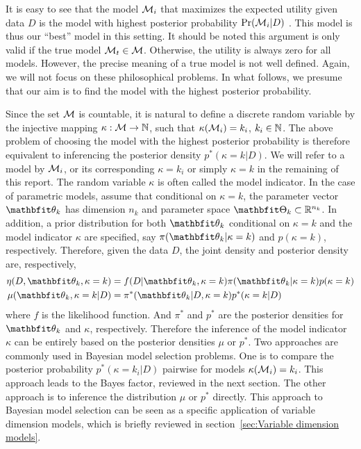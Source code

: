 It is easy to see that the model $\mathcal{M}_i$ that maximizes the expected utility
given data $D$ is the model with highest posterior probability
$\Pr(\mathcal{M}_i|D)$ \parencite[see][chap.~6]{Bernardo2000}. This model is thus
our ``best'' model in this setting. It should be noted this argument is only
valid if the true model $\mathcal{M}_t \in \mathcal{M}$. Otherwise, the utility is always
zero for all models. However, the precise meaning of a true model is not well
defined.  Again, we will not focus on these philosophical problems. In what
follows, we presume that our aim is to find the model with the highest
posterior probability.

Since the set $\mathcal{M}$ is countable, it is natural to define a discrete random
variable by the injective mapping $\kappa:\mathcal{M}\to\mathbb{N}$, such that
$\kappa(\mathcal{M}_i) = k_i$, $k_i \in \mathbb{N}$. The above problem of choosing the
model with the highest posterior probability is therefore equivalent to
inferencing the posterior density $p^*(\kappa = k|D)$. We will refer to a
model by $\mathcal{M}_i$, or its corresponding $\kappa = k_i$ or simply $\kappa = k$
in the remaining of this report. The random variable $\kappa$ is often called
the model indicator. In the case of parametric models, assume that conditional
on $\kappa = k$, the parameter vector $\bth_k$ has dimension $n_k$ and
parameter space $\bTh_k\subset\bbR^{n_k}$. In addition, a prior distribution
for both $\bth_k$ conditional on $\kappa = k$ and the model indicator $\kappa$
are specified, say $\pi(\bth_k|\kappa =k)$ and $p(\kappa = k)$, respectively.
Therefore, given the data $D$, the joint density and posterior density are,
respectively,
\begin{align}
  \eta(D,\bth_k,\kappa=k)
  &= f(D|\bth_k,\kappa=k)\pi(\bth_k|\kappa=k)p(\kappa=k)
  \label{eq:full joint}\\
  \mu(\bth_k,\kappa=k|D)
  &= \pi^*(\bth_k|D,\kappa=k)p^*(\kappa=k|D)
  \label{eq:full posterior}
\end{align}
where $f$ is the likelihood function. And $\pi^*$ and $p^*$ are the posterior
densities for $\bth_k$ and $\kappa$, respectively. Therefore the inference of
the model indicator $\kappa$ can be entirely based on the posterior densities
$\mu$ or $p^*$. Two approaches are commonly used in Bayesian model selection
problems. One is to compare the posterior probability $p^*(\kappa=k_i|D)$
pairwise for models $\kappa(\mathcal{M}_i) = k_i$. This approach leads to the Bayes
factor, reviewed in the next section. The other approach is to inference the
distribution $\mu$ or $p^*$ directly. This approach to Bayesian model
selection can be seen as a specific application of variable dimension models,
which is briefly reviewed in section~\ref{sec:Variable dimension models}.

